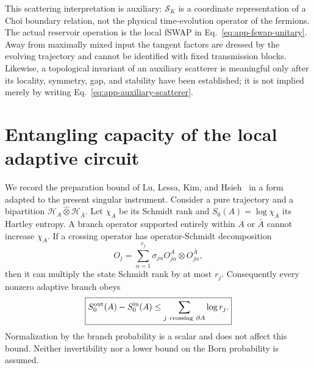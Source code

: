 This scattering interpretation is auxiliary: \(\mathcal S_K\) is a
coordinate representation of a Choi boundary relation, not the physical
time-evolution operator of the fermions.  The actual reservoir operation is
the local fSWAP in Eq.~\eqref{eq:app-fswap-unitary}.  Away from maximally
mixed input the tangent factors are dressed by the evolving trajectory and
cannot be identified with fixed transmission blocks.  Likewise, a
topological invariant of an auxiliary scatterer is meaningful only after
its locality, symmetry, gap, and stability have been established; it is not
implied merely by writing Eq.~\eqref{eq:app-auxiliary-scatterer}.



\section{Entangling capacity of the local adaptive circuit}
\label{app:adaptive-depth-bound}

We record the preparation bound of Lu, Lessa, Kim, and
Hsieh~\cite{LuLessaKimHsieh2022} in a form adapted to the present singular
instrument.  Consider a pure trajectory and a bipartition
\(\mathcal H_A\widehat\otimes\mathcal H_{\bar A}\).  Let \(\chi_A\) be its
Schmidt rank and \(S_0(A)=\log\chi_A\) its Hartley entropy.  A branch
operator supported entirely within \(A\) or \(\bar A\) cannot increase
\(\chi_A\).  If a crossing operator has operator-Schmidt decomposition
\begin{equation}
    O_j=\sum_{\alpha=1}^{r_j}
    \sigma_{j\alpha}O^A_{j\alpha}\otimes O^{\bar A}_{j\alpha},
    \label{eq:app-operator-schmidt-decomposition}
\end{equation}
then it can multiply the state Schmidt rank by at most \(r_j\).  Consequently
every nonzero adaptive branch obeys
\begin{equation}
    \boxed{
    S_0^{\rm out}(A)-S_0^{\rm in}(A)
    \le\sum_{j\ {\rm crossing}\ \partial A}\log r_j.}
    \label{eq:app-exact-cut-capacity}
\end{equation}
Normalization by the branch probability is a scalar and does not affect this
bound.  Neither invertibility nor a lower bound on the Born probability is
assumed.


